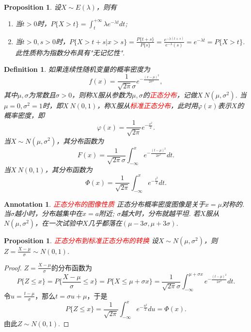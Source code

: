 \documentclass{article}
\newtheorem{proposition}[theorem]{Proposition}
\newtheorem{definition}[theorem]{Definition}
\newtheorem{annotation}[theorem]{Annotation}
\newcommand{\redt}[1]{\textcolor{red}{#1}}
\begin{document}
\begin{proposition}
\rm 设$X \sim E(\lambda)$，则有
\begin{enumerate}
	\item 当$t > 0$时，$P\{X > t\} = \int_t^{+\infty} \lambda e^{-\lambda t}dt$;
	\item 当$t > 0, s >0$时，$P\{X > t+s |x > s\} = \frac{P\{t+s\}}{P\{s\}} = \frac{e^{-\lambda(t+s)}}{e^{-\lambda}(s)} = e^{-\lambda t} = P\{X > t\}$. 此性质称为指数分布具有"无记忆性". 
\end{enumerate}
\end{proposition}

\begin{definition}
\rm 如果连续性随机变量的概率密度为
$$
f(x) = \frac{1}{\sqrt{2\pi}\sigma}e^{-\frac{(x-\mu)^2}{2\sigma^2}},
$$
其中$\mu,\sigma$为常数且$\sigma > 0$，则称$X$服从参数为$\mu,\sigma$的\redt{正态分布}，记做$X~N(\mu,\sigma^2)$. 当$\mu=0,\sigma^2 =1$时，即$X~N(0,1)$，称$X$服从\redt{标准正态分布}，此时用$\varphi(x)$表示$X$的概率密度，即
$$
\varphi(x) = \frac{1}{\sqrt{2\pi}}e^{-\frac{x^2}{2}}.
$$
当$X \sim N(\mu,\sigma^2)$，其分布函数为
$$
F(x) = \frac{1}{\sqrt{2\pi}\sigma}\int_{-\infty}^{x}e^{-\frac{(t-\mu)^2}{2\sigma^2}}dt. 
$$
当$X~N(0,1)$，其分布函数为
$$
\Phi(x) = \frac{1}{\sqrt{2\pi}}\int_{-\infty}^x e^{-\frac{t^2}{2}}dt.
$$
\end{definition}

\begin{annotation}
\rm \redt{正态分布的图像性质} 正态分布概率密度图像是关于$x = \mu$对称的. 当$\sigma$越小时，分布越集中在$x=a$附近; $\sigma$越大时，分布就越平坦. 若$X$服从$N(\mu,\sigma^2)$，在一次试验中$X$几乎都落在$(\mu-3\sigma,\mu + 3\sigma)$.
\end{annotation}

\begin{proposition}
\rm \redt{正态分布到标准正态分布的转换} 设$X \sim N(\mu,\sigma^2)$，则$Z = \frac{X-\mu}{\sigma} \sim N(0,1)$. 
\end{proposition}

\begin{proof}
\rm $Z=\frac{X-\mu}{\sigma}$的分布函数为
$$
P\{Z \leq x\} = P\{\frac{X-\mu}{\sigma} \leq x\} = P\{X \leq \mu + \sigma x\} =  \frac{1}{\sqrt{2\pi}\sigma}\int_{-\infty}^{\mu+\sigma x}e^{-\frac{(t-\mu)^2}{2\sigma^2}}dt.
$$
令$u = \frac{t-\mu}{\sigma}$，那么$t = \sigma u + \mu$，于是
$$
P\{Z \leq x\} = \frac{1}{\sqrt{2\pi}}\int_{-\infty}^{x} e^{-\frac{u^2}{2}}du = \Phi(x). 
$$
由此$Z \sim N(0,1)$.
\end{proof}
\end{document}
